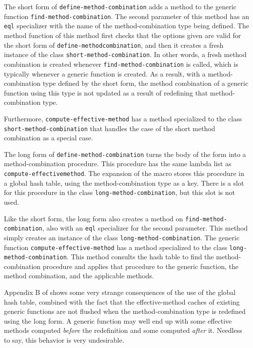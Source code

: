 The short form of \texttt{define-method-combination} adds a method to
the generic function \texttt{find-method-combination}.  The second
parameter of this method has an \texttt{eql} specializer with the name
of the method-combination type being defined.  The method function of
this method first checks that the options given are valid for the
short form of \texttt{define-method\-combination}, and then it creates
a fresh instance of the class \texttt{short-method-combination}.  In
other words, a fresh method combination is created whenever
\texttt{find-method-combination} is called, which is typically
whenever a generic function is created.  As a result, with a
method-combination type defined by the short form, the method
combination of a generic function using this type is not updated as a
result of redefining that method-combination type.

Furthermore, \texttt{compute-effective-method} has a method
specialized to the class \texttt{short-method-combination} that
handles the case of the short method combination as a special case.

The long form of \texttt{define-method-combination} turns the body of
the form into a method-combination procedure.  This procedure has the
same lambda list as \texttt{compute-effective\-method}.  The expansion
of the macro stores this procedure in a global hash table, using the
method-combination type as a key.  There is a slot for this procedure
in the class \texttt{long-method-combination}, but this slot is not
used.

Like the short form, the long form also creates a method on
\texttt{find-method-combination}, also with an \texttt{eql}
specializer for the second parameter. This method simply creates an
instance of the class \texttt{long-method-combination}.  The generic
function \texttt{compute-effective-method} has a method specialized to
the class \texttt{long-method-combination}.  This method consults the
hash table to find the method-combination procedure and applies that
procedure to the generic function, the method combination, and the
applicable methods.

Appendix B of \cite{verna.18.els} shows some very strange consequences
of the use of the global hash table, combined with the fact that the
effective-method caches of existing generic functions are not flushed
when the method-combination type is redefined using the long form.  A
generic function may well end up with some effective methods computed
\emph{before} the redefinition and some computed \emph{after} it.
Needless to say, this behavior is very undesirable.

